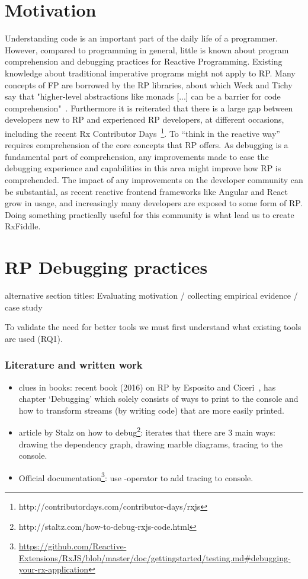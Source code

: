 \section{Motivation}
Understanding code is an important part of the daily life of a programmer. However, compared to programming in general, little is known about program comprehension and debugging practices for Reactive Programming. Existing knowledge about traditional imperative programs might not apply to RP. Many concepts of FP are borrowed by the RP libraries, about which Weck and Tichy say that "higher-level abstractions like monads [...] can be a barrier for code comprehension"~\cite{weck2016visualizing}. Furthermore it is reiterated that there is a large gap between developers new to RP and experienced RP developers, at different occasions, including the recent Rx Contributor Days~\footnote{http://contributordays.com/contributor-days/rxjs}. To ``think in the reactive way'' requires comprehension of the core concepts that RP offers. As debugging is a fundamental part of comprehension, any improvements made to ease the debugging experience and capabilities in this area might improve how RP is comprehended.
The impact of any improvements on the developer community can be substantial, as recent reactive frontend frameworks like Angular and React grow in usage, and increasingly many developers are exposed to some form of RP. Doing something practically useful for this community is what lead us to create RxFiddle.

\section{RP Debugging practices}
{\color{red} alternative section titles: Evaluating motivation / collecting empirical evidence / case study}

To validate the need for better tools we must first understand what existing tools are used (RQ1).

\subsubsection{Literature and written work}
\begin{itemize}
	\item clues in books: recent book (2016) on RP by Esposito and Ciceri~\cite{esposito2016reactive}, has chapter `Debugging' which solely consists of ways to print to the console and how to transform streams (by writing code) that are more easily printed.
	\item article by Stalz on how to debug\footnote{http://staltz.com/how-to-debug-rxjs-code.html}: iterates that there are 3 main ways: drawing the dependency graph, drawing marble diagrams, tracing to the console.
	\item Official documentation\footnote{\url{https://github.com/Reactive-Extensions/RxJS/blob/master/doc/gettingstarted/testing.md\#debugging-your-rx-application}}: use -operator to add tracing to console.
\end{itemize}

